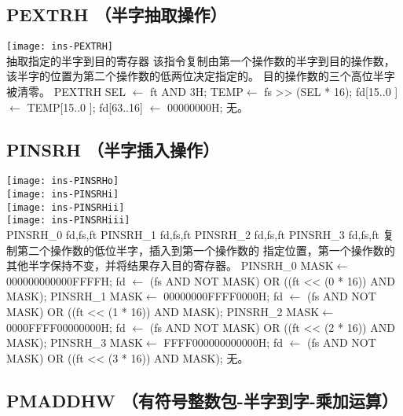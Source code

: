 \subsection{PEXTRH （半字抽取操作）}

\begin{instructionblk}
  \texttt{[image: ins-PEXTRH]} \\
  {抽取指定的半字到目的寄存器}
  {该指令复制由第一个操作数的半字到目的操作数，
  该半字的位置为第二个操作数的低两位决定指定的。
  目的操作数的三个高位半字被清零。}
  {PEXTRH \narrownewline
  SEL $\leftarrow$ ft AND 3H; \narrownewline
  TEMP$\leftarrow$ fs >> (SEL * 16); \narrownewline
  fd[15..0 ] $\leftarrow$ TEMP[15..0 ]; \narrownewline
  fd[63..16] $\leftarrow$ 00000000H;}
  {无。}
\end{instructionblk}

\subsection{PINSRH （半字插入操作）}

\begin{instructionblk}
  \texttt{[image: ins-PINSRHo]} \\
  \texttt{[image: ins-PINSRHi]} \\
  \texttt{[image: ins-PINSRHii]} \\
  \texttt{[image: ins-PINSRHiii]} \\
  \instructionbody
  {PINSRH\_0 fd,fs,ft \narrownewline PINSRH\_1 fd,fs,ft \narrownewline PINSRH\_2 fd,fs,ft \narrownewline PINSRH\_3 fd,fs,ft}
  {}
  {复制第二个操作数的低位半字，插入到第一个操作数的
  指定位置，第一个操作数的其他半字保持不变，并将结果存入目的寄存器。}
  {PINSRH\_0 \narrownewline
  MASK$\leftarrow$ 000000000000FFFFH; \narrownewline
  fd  $\leftarrow$ (fs AND NOT MASK) OR ((ft << (0 * 16)) AND MASK); \narrownewline
  PINSRH\_1 \narrownewline
  MASK$\leftarrow$ 00000000FFFF0000H; \narrownewline
  fd  $\leftarrow$ (fs AND NOT MASK) OR ((ft << (1 * 16)) AND MASK); \narrownewline
  PINSRH\_2 \narrownewline
  MASK$\leftarrow$ 0000FFFF00000000H; \narrownewline
  fd  $\leftarrow$ (fs AND NOT MASK) OR ((ft << (2 * 16)) AND MASK); \narrownewline
  PINSRH\_3 \narrownewline
  MASK$\leftarrow$ FFFF000000000000H; \narrownewline
  fd  $\leftarrow$ (fs AND NOT MASK) OR ((ft << (3 * 16)) AND MASK);}
  {无。}
\end{instructionblk}

\subsection{PMADDHW （有符号整数包-半字到字-乘加运算）}

